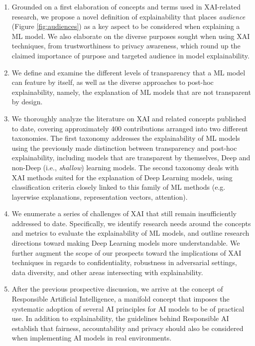 \documentclass[final]{elsarticle}
\begin{document}
\begin{enumerate}[leftmargin=*]
\item Grounded on a first elaboration of concepts and terms used in XAI-related research, we propose a novel definition of explainability that places \emph{audience} (Figure \ref{fig:audiences}) as a key aspect to be considered when explaining a ML model. We also elaborate on the diverse purposes sought when using XAI techniques, from trustworthiness to privacy awareness, which round up the claimed importance of purpose and targeted audience in model explainability.

\item We define and examine the different levels of transparency that a ML model can feature by itself, as well as the diverse approaches to post-hoc explainability, namely, the explanation of ML models that are not transparent by design.

\item We thoroughly analyze the literature on XAI and related concepts published to date, covering approximately 400 contributions arranged into two different taxonomies. The first taxonomy addresses the explainability of ML models using the previously made distinction between transparency and post-hoc explainability, including models that are transparent by themselves, Deep and non-Deep (i.e., \emph{shallow}) learning models. The second taxonomy deals with XAI methods suited for the explanation of Deep Learning models, using classification criteria closely linked to this family of ML methods (e.g. layerwise explanations, representation vectors, attention).

\item We enumerate a series of challenges of XAI that still remain insufficiently addressed to date. Specifically, we identify research needs around the concepts and metrics to evaluate the explainability of ML models, and outline research directions toward making Deep Learning models more understandable. We further augment the scope of our prospects toward the implications of XAI techniques in regards to confidentiality, robustness in adversarial settings, data diversity, and other areas intersecting with explainability.

\item After the previous prospective discussion, we arrive at the concept of Responsible Artificial Intelligence, a manifold concept that imposes the systematic adoption of several AI principles for AI models to be of practical use. In addition to explainability, the guidelines behind Responsible AI establish that fairness, accountability and privacy should also be considered when implementing AI models in real environments. 


\end{enumerate}
\end{document}
